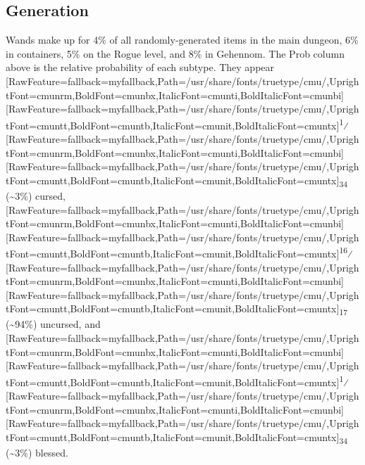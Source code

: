 \subsection{Generation}
\label{2}
Wands make up for 4\% of all randomly-{}generated items in the main dungeon, 6\% in containers, 5\% on the Rogue level, and 8\% in Gehennom. The Prob column above is the relative probability of each subtype. They appear \allowbreak{}\setmainfont{cmunrm.ttf}[RawFeature={fallback=myfallback},Path=/usr/share/fonts/truetype/cmu/,UprightFont=cmunrm,BoldFont=cmunbx,ItalicFont=cmunti,BoldItalicFont=cmunbi]\setmonofont{cmunrm.ttf}[RawFeature={fallback=myfallback},Path=/usr/share/fonts/truetype/cmu/,UprightFont=cmuntt,BoldFont=cmuntb,ItalicFont=cmunit,BoldItalicFont=cmuntx]\textsuperscript{1}⁄\allowbreak{}\setmainfont{cmunrm.ttf}[RawFeature={fallback=myfallback},Path=/usr/share/fonts/truetype/cmu/,UprightFont=cmunrm,BoldFont=cmunbx,ItalicFont=cmunti,BoldItalicFont=cmunbi]\setmonofont{cmunrm.ttf}[RawFeature={fallback=myfallback},Path=/usr/share/fonts/truetype/cmu/,UprightFont=cmuntt,BoldFont=cmuntb,ItalicFont=cmunit,BoldItalicFont=cmuntx]\textsubscript{34} (\~{}3\%) cursed, \allowbreak{}\setmainfont{cmunrm.ttf}[RawFeature={fallback=myfallback},Path=/usr/share/fonts/truetype/cmu/,UprightFont=cmunrm,BoldFont=cmunbx,ItalicFont=cmunti,BoldItalicFont=cmunbi]\setmonofont{cmunrm.ttf}[RawFeature={fallback=myfallback},Path=/usr/share/fonts/truetype/cmu/,UprightFont=cmuntt,BoldFont=cmuntb,ItalicFont=cmunit,BoldItalicFont=cmuntx]\textsuperscript{16}⁄\allowbreak{}\setmainfont{cmunrm.ttf}[RawFeature={fallback=myfallback},Path=/usr/share/fonts/truetype/cmu/,UprightFont=cmunrm,BoldFont=cmunbx,ItalicFont=cmunti,BoldItalicFont=cmunbi]\setmonofont{cmunrm.ttf}[RawFeature={fallback=myfallback},Path=/usr/share/fonts/truetype/cmu/,UprightFont=cmuntt,BoldFont=cmuntb,ItalicFont=cmunit,BoldItalicFont=cmuntx]\textsubscript{17} (\~{}94\%) uncursed, and \allowbreak{}\setmainfont{cmunrm.ttf}[RawFeature={fallback=myfallback},Path=/usr/share/fonts/truetype/cmu/,UprightFont=cmunrm,BoldFont=cmunbx,ItalicFont=cmunti,BoldItalicFont=cmunbi]\setmonofont{cmunrm.ttf}[RawFeature={fallback=myfallback},Path=/usr/share/fonts/truetype/cmu/,UprightFont=cmuntt,BoldFont=cmuntb,ItalicFont=cmunit,BoldItalicFont=cmuntx]\textsuperscript{1}⁄\allowbreak{}\setmainfont{cmunrm.ttf}[RawFeature={fallback=myfallback},Path=/usr/share/fonts/truetype/cmu/,UprightFont=cmunrm,BoldFont=cmunbx,ItalicFont=cmunti,BoldItalicFont=cmunbi]\setmonofont{cmunrm.ttf}[RawFeature={fallback=myfallback},Path=/usr/share/fonts/truetype/cmu/,UprightFont=cmuntt,BoldFont=cmuntb,ItalicFont=cmunit,BoldItalicFont=cmuntx]\textsubscript{34} (\~{}3\%) blessed.


